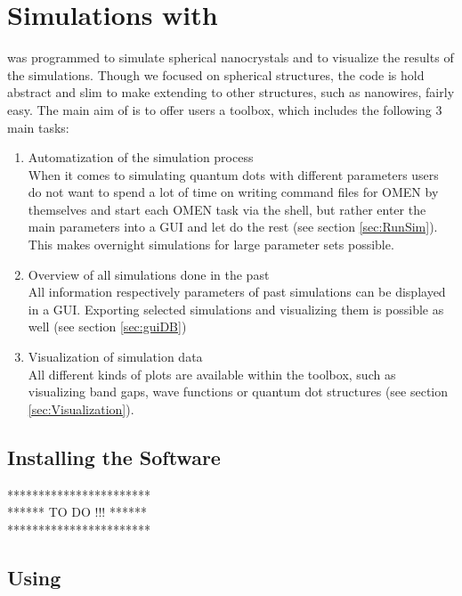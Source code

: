 \chapter{Simulations with \software}

	\software was programmed to simulate spherical nanocrystals and to visualize the results of the simulations.
	Though we focused on spherical structures, the code is hold abstract and slim to make extending to other
	structures, such as nanowires, fairly easy.
	The main aim of \software is to offer \omen users a toolbox, which includes the following 3 main tasks:
	\begin{enumerate}
		\itemsep 0pt
		\item Automatization of the \omen simulation process \\
					When it comes to simulating quantum dots with different parameters users do not want to spend a lot
					of time on writing command files for OMEN by themselves and start each OMEN task via the shell, but 
					rather enter the main parameters into a \gls{GUI} and let \software do the rest (see section \ref{sec:RunSim}).
					This makes overnight simulations for large parameter sets possible.
		\item Overview of all simulations done in the past	\\
					All information respectively parameters of past simulations can be displayed in a \gls{GUI}. Exporting selected
					simulations and visualizing them is possible as well (see section \ref{sec:guiDB})
		\item Visualization of simulation data	\\
					All different kinds of plots are available within the toolbox, such as visualizing band gaps, wave functions or
					quantum dot structures (see section \ref{sec:Visualization}).
	\end{enumerate}

	\section{Installing the Software}
		*********************** \\
		****** TO DO !!! ****** \\
		*********************** \\
	
	\section{Using \software}
